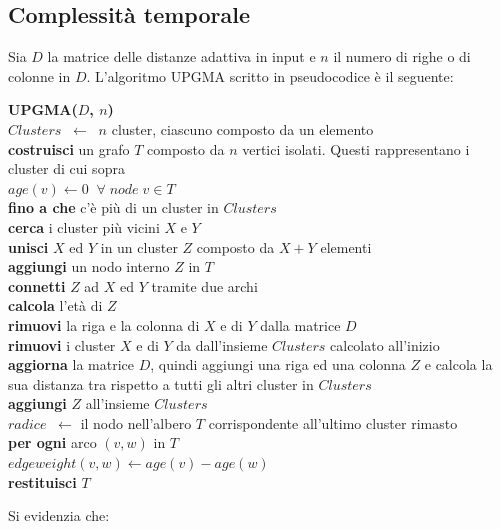 \subsection{Complessità temporale}
Sia $D$ la matrice delle distanze adattiva in input e $n$ il numero di righe o di colonne in $D$. L'algoritmo UPGMA scritto in pseudocodice è il seguente:
\begin{framed}\noindent
  \textbf{UPGMA($D$, $n$)}\\
   $Clusters \;\; \leftarrow \;\; n$ cluster, ciascuno composto da un elemento \\
  \textbf{costruisci} un grafo $T$ composto da $n$ vertici isolati. Questi rappresentano i cluster di cui sopra\\
  $age(v)\leftarrow 0 \;\; \forall \; node \; v \in T$\\
  \textbf{fino a che} c'è più di un cluster in $Clusters$ \\
  \indent \textbf{cerca} i cluster più vicini $X$ e $Y$\\
  \indent \textbf{unisci} $X$ ed $Y$ in un cluster $Z$ composto da $X+Y$ elementi\\
  \indent \textbf{aggiungi} un nodo interno $Z$ in $T$\\
  \indent \textbf{connetti} $Z$ ad $X$ ed $Y$ tramite due archi \\
  \indent \textbf{calcola} l'età di $Z$\\
  \indent \textbf{rimuovi} la riga e la colonna di $X$ e di $Y$ dalla matrice $D$ \\
  \indent \textbf{rimuovi} i cluster $X$ e di $Y$  da dall'insieme $Clusters$ calcolato all'inizio \\
  \indent \textbf{aggiorna} la matrice $D$, quindi aggiungi una riga ed una colonna $Z$ e calcola la sua distanza tra rispetto a tutti gli altri cluster in $Clusters$ \\
  \indent \textbf{aggiungi} $Z$ all'insieme $Clusters$ \\
  $radice \;\; \leftarrow $ il nodo nell'albero $T$ corrispondente all'ultimo cluster rimasto \\
  \textbf{per ogni} arco $(v, w)$ in $T$\\
  \indent $edgeweight(v, w) \leftarrow age(v) - age(w) $\\
  \textbf{restituisci} $T$
\end{framed}
Si evidenzia che:
